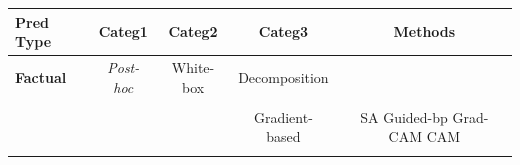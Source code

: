\iffalse
\begin{table}[htbp]
\footnotesize
\begin{tabular}{|l  |c |   c|   c | c  |}
\hline

Pred Type & Categ1    & Categ2  & Categ3    & Methods    \\ \hline
\textbf{Factual}     & \textit{Post-hoc}    & White-box   & Decomposition  & \cite{GNN-LRP} \cite{Excitation-BP} \cite{co-operative}   \\ %
                &     &    &   &      \\ \hline
        
            &   &   & Gradient-based  & SA\cite{guided-bp} Guided-bp\cite{guided-bp} Grad-CAM\cite{Excitation-BP} CAM\cite{Excitation-BP}     \\ %
             &    &    &     &       \\ \hline \hline
             

\end{tabular}
\end{table}
